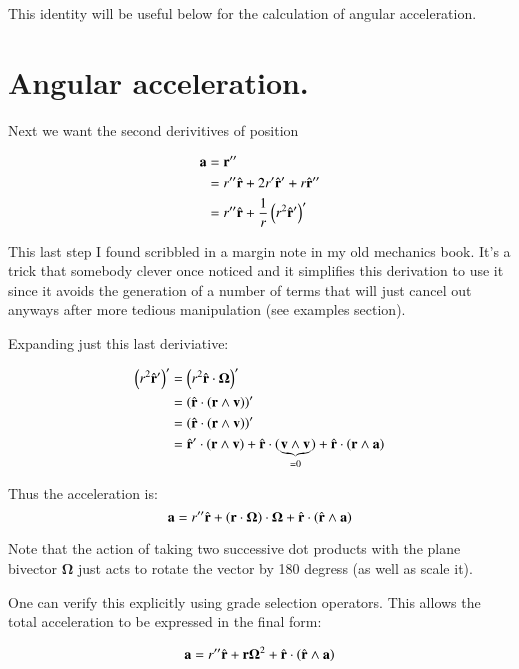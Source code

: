 \documentclass{article}      %
\newcommand{\BOmega}[0]{\boldsymbol{\Omega}}
\begin{document}
This identity will be useful below for the calculation of angular acceleration.

\section{ Angular acceleration. }

Next we want the second derivitives of position

\begin{align*}
\mathbf{a} 
&= \mathbf{r}'' \\
&= r'' \hat{\mathbf{r}} + 2r' \hat{\mathbf{r}}' + r \hat{\mathbf{r}}'' \\
&= r'' \hat{\mathbf{r}} + \frac{1}{r}\left( r^2 \hat{\mathbf{r}}' \right)' \\
\end{align*}

This last step I found scribbled in a margin note in 
my old mechanics book.  It's a trick that somebody clever once noticed and it simplifies this derivation to use it
since it avoids the generation of a number of terms that will just cancel out anyways after more tedious manipulation
(see examples section).

Expanding just this last deriviative:

\begin{align*}
\left( r^2 \rcap' \right)'
&= \left( r^2 \rcap \cdot \BOmega \right)' \\
&= \left( \rcap \cdot \left(\Br \wedge \Bv\right) \right)' \\
&= \left( \rcap \cdot \left(\Br \wedge \Bv\right) \right)' \\
&= \rcap' \cdot \left(\Br \wedge \Bv\right) +\rcap \cdot (\underbrace{\Bv \wedge \Bv}_{=0}) + \rcap \cdot \left(\Br \wedge \Ba\right) \\
\end{align*}

Thus the acceleration is:
\begin{equation*}
\Ba = r'' \rcap + \left(\Br \cdot \BOmega\right) \cdot \BOmega + \rcap \cdot \left(\rcap \wedge \Ba\right)
\end{equation*}


Note that the action of taking two successive dot products with the plane bivector $\BOmega$ just acts to rotate the
vector by 180 degress (as well as scale it).

One can verify this explicitly using grade selection operators.  This allows the total acceleration to be expressed
in the final form:

\begin{equation*}
\Ba = r'' \rcap + \Br \BOmega^2 + \rcap \cdot \left(\rcap \wedge \Ba\right)
\end{equation*}
\end{document}

